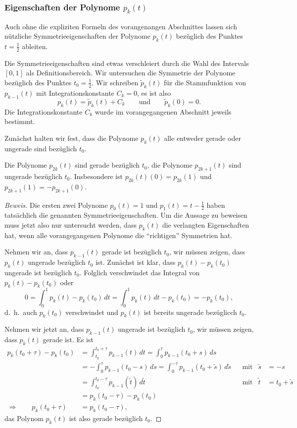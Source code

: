 \subsubsection{Eigenschaften der Polynome $p_k(t)$}
Auch ohne die expliziten Formeln des vorangenangen Abschnittes lassen sich
nützliche Symmetrieeigenschaften der Polynome $p_k(t)$ bezüglich des
Punktes $t=\frac12$ ableiten.

Die Symmetrieeigenschaften sind etwas verschleiert durch die Wahl
des Intervals $[0,1]$ als Definitionsbereich.
Wir untersuchen die Symmetrie der Polynome bezüglich des Punktes
$t_0=\frac12$.
Wir schreiben $\tilde{p}_k(t)$ für die Stammfunktion von $p_{k-1}(t)$ 
mit Integrationskonstante $C_k=0$, es ist also
\[
p_k(t) = \tilde{p}_k(t) + C_k
\qquad\text{und}\qquad
\tilde{p}_k(0)=0.
\]
Die Integrationskonstante $C_k$ wurde im vorangegangenen Abschnitt
jeweils bestimmt.

Zunächst halten wir fest, dass die Polynome $p_k(t)$ alle
entweder gerade oder ungerade sind bezüglich $t_0$.

\begin{lemma}
\label{buch:lemma:pk}
Die Polynome $p_{2k}(t)$ sind gerade bezüglich $t_0$, die Polynome
$p_{2k+1}(t)$ sind ungerade bezüglich $t_0$.
Insbesondere ist $p_{2k}(t)(0)=p_{2k}(1)$ und
$p_{2k+1}(1)=-p_{2k+1}(0)$.
\end{lemma}

\begin{proof}[Beweis]
Die ersten zwei Polynome $p_0(t)=1$ und $p_1(t)=t-\frac12$ haben
tatsächlich die genannten Symmetrieeigenschaften.
Um die Aussage zu beweisen muss jetzt also nur untersucht werden,
dass $p_k(t)$ die verlangten Eigenschaften hat, wenn alle vorangegangenen
Polynome die ``richtigen'' Symmetrien hat.

Nehmen wir an, dass $p_{k-1}(t)$ gerade ist bezüglich $t_0$,
wir müssen zeigen, dass $p_k(t)$ ungerade bezüglich $t_0$ ist.
Zunächst ist klar, dass $p_k(t)-p_k(t_0)$ ungerade ist bezüglich
$t_0$.
Folglich verschwindet das Integral von $p_k(t)-p_k(t_0)$ oder
\[
0
=
\int_0^1p_{k}(t)-p_{k}(t_0)\,dt
=
\int_0^1p_k(t)\,dt - p_k(t_0)
=
-p_k(t_0),
\]
d.~h.~auch $p_k(t_0)$ verschwindet und $p_k(t)$ ist bereits ungerade
bezüglicch $t_0$.

Nehmen wir jetzt an, dass $p_{k-1}(t)$ ungerade ist bezüglich $t_0$,
wir müssen zeigen, dass $p_k(t)$ gerade ist.
Es ist
\begin{align*}
p_k(t_0 +\tau)
-
p_k(t_0)
&=
\int_{t_0}^{t_0+\tau} p_{k-1}(t)\,dt
=
\int_0^\tau p_{k-1}(t_0+s)\,ds
\\
&=
-
\int_0^\tau p_{k-1}(t_0-s)\,ds
=
\int_0^{-\tau} p_{k-1}(t_0+\tilde{s})\,d\tilde{s}
&&\text{mit}
&\tilde{s}&=-s
\\
&=
\int_{t_0}^{t_0-\tau} p_{k-1}(\tilde{t})\,d\tilde{t}
&&\text{mit}
&\tilde{t}&=t_0+\tilde{s}
\\
&=
p_k(t_0-\tau)-p_k(t_0)
\\
\Rightarrow\qquad
p_k(t_0+\tau)
&=
p_k(t_0-\tau),
\end{align*}
das Polynom $p_k(t)$ ist also gerade bezüglich $t_0$.
\end{proof}

